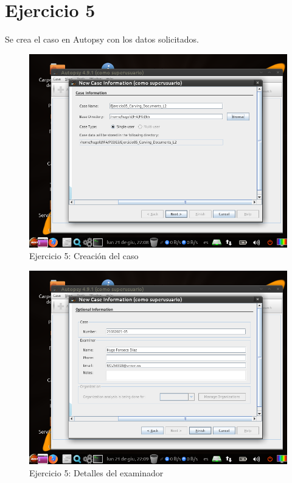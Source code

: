\documentclass[11pt]{article}
\begin{document}
\section{Ejercicio 5}
Se crea el caso en Autopsy con los datos solicitados.

\begin{figure}[H]
  \caption{Ejercicio 5: Creación del caso}
  \centering
  \includegraphics[scale=0.7]{e5-1.png}
\end{figure}

\begin{figure}[H]
  \caption{Ejercicio 5: Detalles del examinador}
  \centering
  \includegraphics[scale=0.7]{e5-2.png}
\end{figure}
\end{document}
